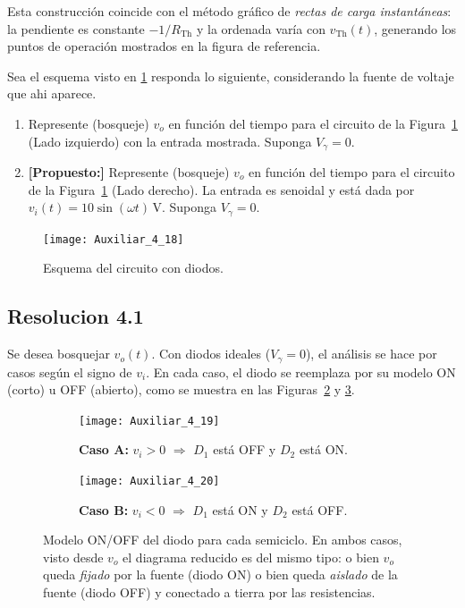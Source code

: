 \documentclass[
  11pt,
  letterpaper,
   addpoints,
   answers
  ]{exam}
\begin{document}
\begin{questions}
\begin{solution}
Esta construcción coincide con el método gráfico de \emph{rectas de carga instantáneas}:
la pendiente es constante $-1/R_{\text{Th}}$ y la ordenada varía con $v_{\text{Th}}(t)$, generando los puntos de operación mostrados en la figura de referencia.

\end{solution}

\question Sea el esquema visto en \ref{fig:P2_17} responda lo siguiente, considerando la fuente de voltaje que ahi aparece.
\begin{enumerate}
    \item Represente (bosqueje) \(v_o\) en función del tiempo para el circuito de la Figura~\ref{fig:P2_17} (Lado izquierdo)
    con la entrada mostrada. Suponga \(V_\gamma = 0\).
    \item \textbf{[Propuesto:]} Represente (bosqueje) \(v_o\) en función del tiempo para el circuito de la
  Figura~\ref{fig:P2_17} (Lado derecho). La entrada es senoidal y está dada por
  \(v_i(t) = 10 \sin(\omega t)\,\text{V}\). Suponga \(V_\gamma = 0\).
\end{enumerate}

\begin{figure}[H]
    \centering
    \texttt{[image: Auxiliar\_4\_18]}
  \caption{Esquema del circuito con diodos.}
    \label{fig:P2_17}
\end{figure}

\begin{solution}
    \subsection*{Resolucion 4.1}
   
Se desea bosquejar \(v_o(t)\). Con diodos ideales (\(V_\gamma=0\)), el análisis se hace por casos según el signo de \(v_i\). En cada caso, el diodo se reemplaza por su modelo ON (corto) u OFF (abierto), como se muestra en las Figuras~\ref{fig:resolucion4.1a} y \ref{fig:resolucion4.1b}.

\begin{figure}[H]
  \centering
  \begin{subfigure}[b]{0.48\textwidth}
    \centering
    \texttt{[image: Auxiliar\_4\_19]}
    \caption{\textbf{Caso A:} \(v_i>0\) $\Rightarrow$ \(D_1\) está OFF y \(D_2\) está ON.}
    \label{fig:resolucion4.1a}
  \end{subfigure}\hfill
  \begin{subfigure}[b]{0.48\textwidth}
    \centering
    \texttt{[image: Auxiliar\_4\_20]}
    \caption{\textbf{Caso B:} \(v_i<0\) $\Rightarrow$ \(D_1\) está ON y \(D_2\) está OFF.}
    \label{fig:resolucion4.1b}
  \end{subfigure}
  \caption{Modelo ON/OFF del diodo para cada semiciclo. En ambos casos, visto desde \(v_o\) el diagrama reducido es del mismo tipo: o bien \(v_o\) queda \emph{fijado} por la fuente (diodo ON) o bien queda \emph{aislado} de la fuente (diodo OFF) y conectado a tierra por las resistencias.}
  \label{fig:resolucion4.1}
\end{figure}


\end{solution}
\end{questions}
\end{document}
